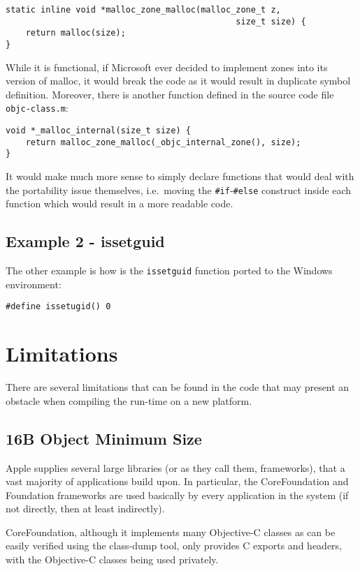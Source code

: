 \begin{verbatim}
static inline void *malloc_zone_malloc(malloc_zone_t z, 
                                              size_t size) { 
    return malloc(size); 
}
\end{verbatim}

While it is functional, if Microsoft ever decided to implement zones into its version of malloc, it would break the code as it would result in duplicate symbol definition. Moreover, there is another function defined in the source code file \verb=objc-class.m=:

\begin{verbatim}
void *_malloc_internal(size_t size) {
    return malloc_zone_malloc(_objc_internal_zone(), size);
}
\end{verbatim}

It would make much more sense to simply declare functions that would deal with the portability issue themselves, i.e.\ moving the \verb=#if=-\verb=#else= construct inside each function which would result in a more readable code.

\subsection{Example 2 - issetguid}
The other example is how is the \verb=issetguid= function ported to the Windows environment:

\begin{verbatim}
#define issetugid() 0
\end{verbatim}

\section{Limitations}
There are several limitations that can be found in the code that may present an obstacle when compiling the run-time on a new platform.

\subsection{16B Object Minimum Size}
Apple supplies several large libraries (or as they call them, frameworks), that a vast majority of applications build upon. In particular, the CoreFoundation and Foundation frameworks are used basically by every application in the system (if not directly, then at least indirectly).

CoreFoundation, although it implements many Objective-C classes as can be easily verified using the class-dump tool\cite{class_dump}, only provides C exports and headers, with the Objective-C classes being used privately.

